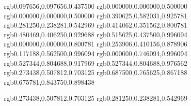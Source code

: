 \definecolor{MidnightBlue}              {rgb}{0.097656,0.097656,0.437500}
\definecolor{navy}              {rgb}{0.000000,0.000000,0.500000}
\definecolor{NavyBlue}          {rgb}{0.000000,0.000000,0.500000}
\definecolor{CornflowerBlue}            {rgb}{0.390625,0.582031,0.925781}
\definecolor{DarkSlateBlue}             {rgb}{0.281250,0.238281,0.542969} %
\definecolor{SlateBlue}         {rgb}{0.414062,0.351562,0.800781}
\definecolor{MediumSlateBlue}           {rgb}{0.480469,0.406250,0.929688}
\definecolor{LightSlateBlue}            {rgb}{0.515625,0.437500,0.996094}
\definecolor{MediumBlue}                {rgb}{0.000000,0.000000,0.800781}
\definecolor{RoyalBlue}         {rgb}{0.253906,0.410156,0.878906}
\definecolor{DodgerBlue}                {rgb}{0.117188,0.562500,0.996094}
\definecolor{DeepSkyBlue}               {rgb}{0.000000,0.746094,0.996094}
\definecolor{SkyBlue}           {rgb}{0.527344,0.804688,0.917969}
\definecolor{LightSkyBlue}              {rgb}{0.527344,0.804688,0.976562}
\definecolor{SteelBlue}         {rgb}{0.273438,0.507812,0.703125}
\definecolor{LightSteelBlue}            {rgb}{0.687500,0.765625,0.867188}
\definecolor{LightBlue}         {rgb}{0.675781,0.843750,0.898438}

\definecolor{blue}           {rgb}{0.273438,0.507812,0.703125} %
\definecolor{blue}             {rgb}{0.281250,0.238281,0.542969} %

